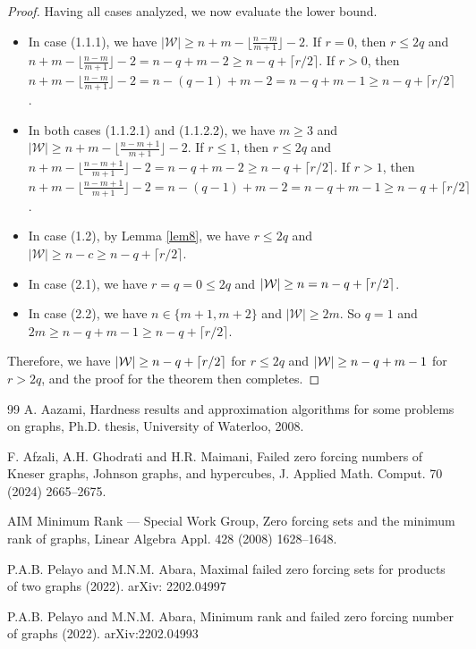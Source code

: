 \documentclass[preprint,12pt]{elsarticle}
\begin{document}
{\begin{proof}
Having all cases analyzed, we now evaluate the lower bound.
\begin{itemize}
\item
In case (1.1.1), we have
$|\mathcal{W}|\ge n+m-\lfloor\frac{n-m}{m+1}\rfloor-2$.
If $r=0$, then $r\le 2q$ and
$n+m-\lfloor\frac{n-m}{m+1}\rfloor-2=n-q+m-2\ge n-q+\lceil r/2\rceil$.
If $r>0$, then
$n+m-\lfloor\frac{n-m}{m+1}\rfloor-2=n-(q-1)+m-2=n-q+m-1
\ge n-q+\lceil r/2\rceil$.
\item
In both cases (1.1.2.1) and (1.1.2.2), we have $m\ge 3$ and
$|\mathcal{W}|\ge n+m-\lfloor\frac{n-m+1}{m+1}\rfloor-2$.
If $r\le 1$, then $r\le 2q$ and
$n+m-\lfloor\frac{n-m+1}{m+1}\rfloor-2=n-q+m-2
\ge n-q+\lceil r/2\rceil$.
If $r>1$, then
$n+m-\lfloor\frac{n-m+1}{m+1}\rfloor-2=n-(q-1)+m-2=n-q+m-1
\ge n-q+\lceil r/2\rceil$.
\item
In case (1.2), by Lemma \ref{lem8}, we have $r\le 2q$
and $|\mathcal{W}|\ge n-c\ge n-q+\lceil r/2\rceil$.
\item
In case (2.1), we have $r=q=0\le 2q$ and $|{\cal W}|\ge n=n-q+\lceil r/2\rceil$.
\item
In case (2.2), we have $n\in\{m+1,m+2\}$ and $|\mathcal{W}|\ge 2m$.
So $q=1$ and $2m\ge n-q+m-1\ge n-q+\lceil r/2\rceil$.
\end{itemize}

Therefore, we have
$|{\cal W}|\ge n-q+\lceil r/2\rceil$ for $r\le 2q$
and $|{\cal W}|\ge n-q+m-1$ for $r> 2q$,
and the proof for the theorem then completes.
\end{proof}



\begin{thebibliography}{99}
A. Aazami,
Hardness results and approximation algorithms for some problems on graphs,
Ph.D. thesis, University of Waterloo, 2008.

F. Afzali, A.H. Ghodrati and H.R. Maimani,
Failed zero forcing numbers of Kneser graphs, Johnson graphs, and hypercubes,
J. Applied Math. Comput. 70 (2024) 2665--2675.

AIM Minimum Rank --- Special Work Group,
Zero forcing sets and the minimum rank of graphs,
Linear Algebra Appl. 428 (2008) 1628--1648.

P.A.B. Pelayo and M.N.M. Abara,
Maximal failed zero forcing sets for products of two graphs (2022).
arXiv: 2202.04997

P.A.B. Pelayo and M.N.M. Abara,
Minimum rank and failed zero forcing number of graphs (2022).
arXiv:2202.04993


\end{thebibliography}}
\end{document}
